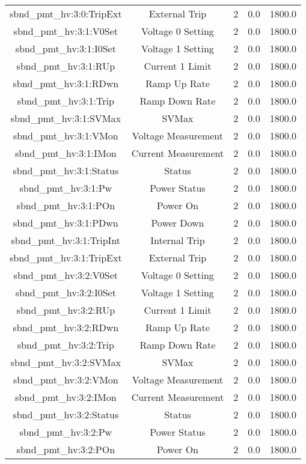 \begin{center}
\begin{longtable}{c | c c c c }
sbnd\_pmt\_hv:3:0:TripExt & External Trip & 2 & 0.0 & 1800.0\\ 
sbnd\_pmt\_hv:3:1:V0Set & Voltage 0 Setting & 2 & 0.0 & 1800.0\\ 
sbnd\_pmt\_hv:3:1:I0Set & Voltage 1 Setting & 2 & 0.0 & 1800.0\\ 
sbnd\_pmt\_hv:3:1:RUp & Current 1 Limit & 2 & 0.0 & 1800.0\\ 
sbnd\_pmt\_hv:3:1:RDwn & Ramp Up Rate & 2 & 0.0 & 1800.0\\ 
sbnd\_pmt\_hv:3:1:Trip & Ramp Down Rate & 2 & 0.0 & 1800.0\\ 
sbnd\_pmt\_hv:3:1:SVMax & SVMax & 2 & 0.0 & 1800.0\\ 
sbnd\_pmt\_hv:3:1:VMon & Voltage Measurement & 2 & 0.0 & 1800.0\\ 
sbnd\_pmt\_hv:3:1:IMon & Current Measurement & 2 & 0.0 & 1800.0\\ 
sbnd\_pmt\_hv:3:1:Status & Status & 2 & 0.0 & 1800.0\\ 
sbnd\_pmt\_hv:3:1:Pw & Power Status & 2 & 0.0 & 1800.0\\ 
sbnd\_pmt\_hv:3:1:POn & Power On & 2 & 0.0 & 1800.0\\ 
sbnd\_pmt\_hv:3:1:PDwn & Power Down & 2 & 0.0 & 1800.0\\ 
sbnd\_pmt\_hv:3:1:TripInt & Internal Trip & 2 & 0.0 & 1800.0\\ 
sbnd\_pmt\_hv:3:1:TripExt & External Trip & 2 & 0.0 & 1800.0\\ 
sbnd\_pmt\_hv:3:2:V0Set & Voltage 0 Setting & 2 & 0.0 & 1800.0\\ 
sbnd\_pmt\_hv:3:2:I0Set & Voltage 1 Setting & 2 & 0.0 & 1800.0\\ 
sbnd\_pmt\_hv:3:2:RUp & Current 1 Limit & 2 & 0.0 & 1800.0\\ 
sbnd\_pmt\_hv:3:2:RDwn & Ramp Up Rate & 2 & 0.0 & 1800.0\\ 
sbnd\_pmt\_hv:3:2:Trip & Ramp Down Rate & 2 & 0.0 & 1800.0\\ 
sbnd\_pmt\_hv:3:2:SVMax & SVMax & 2 & 0.0 & 1800.0\\ 
sbnd\_pmt\_hv:3:2:VMon & Voltage Measurement & 2 & 0.0 & 1800.0\\ 
sbnd\_pmt\_hv:3:2:IMon & Current Measurement & 2 & 0.0 & 1800.0\\ 
sbnd\_pmt\_hv:3:2:Status & Status & 2 & 0.0 & 1800.0\\ 
sbnd\_pmt\_hv:3:2:Pw & Power Status & 2 & 0.0 & 1800.0\\ 
sbnd\_pmt\_hv:3:2:POn & Power On & 2 & 0.0 & 1800.0\\ 

\end{longtable}
\end{center}
